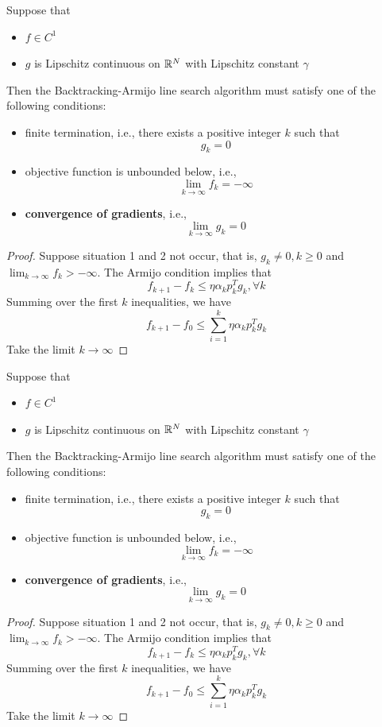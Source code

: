 \begin{refsection}
\begin{corollary}\cite{Robinson2015nonlinear}
	Suppose that
	\begin{itemize}
		\item $f\in C^1$
		\item $g$ is Lipschitz continuous on $\mathbb{R}^N$ with Lipschitz constant $\gamma$
	\end{itemize}
	Then the Backtracking-Armijo line search algorithm must satisfy one of the following conditions:
	\begin{itemize}
		\item finite termination, i.e., there exists a positive integer $k$ such that
		$$g_k = 0$$
		\item objective function is unbounded below, i.e., 
		$$\lim_{k\to \infty} f_k = -\infty$$
		\item \textbf{convergence of gradients}, i.e., 
		$$\lim_{k\to\infty} g_k = 0$$
	\end{itemize}
\end{corollary}
\begin{proof}
	Suppose situation 1 and 2 not occur, that is, $g_k \neq 0, k\geq 0$ and $\lim_{k\to \infty} f_k > -\infty$. 
	The Armijo condition implies that 
	$$f_{k+1}-f_k \leq \eta \alpha_k p_k^T g_k, \forall k$$
	Summing over the first $k$ inequalities, we have
	$$f_{k+1} - f_0 \leq \sum_{i=1}^k \eta \alpha_k p_k^T g_k$$
	Take the limit $k\to \infty$
\end{proof}


\begin{corollary}\cite{Robinson2015nonlinear}
	Suppose that
	\begin{itemize}
		\item $f\in C^1$
		\item $g$ is Lipschitz continuous on $\mathbb{R}^N$ with Lipschitz constant $\gamma$
	\end{itemize}
	Then the Backtracking-Armijo line search algorithm must satisfy one of the following conditions:
	\begin{itemize}
		\item finite termination, i.e., there exists a positive integer $k$ such that
		$$g_k = 0$$
		\item objective function is unbounded below, i.e., 
		$$\lim_{k\to \infty} f_k = -\infty$$
		\item \textbf{convergence of gradients}, i.e., 
		$$\lim_{k\to\infty} g_k = 0$$
	\end{itemize}
\end{corollary}
\begin{proof}
	Suppose situation 1 and 2 not occur, that is, $g_k \neq 0, k\geq 0$ and $\lim_{k\to \infty} f_k > -\infty$. 
	The Armijo condition implies that 
	$$f_{k+1}-f_k \leq \eta \alpha_k p_k^T g_k, \forall k$$
	Summing over the first $k$ inequalities, we have
	$$f_{k+1} - f_0 \leq \sum_{i=1}^k \eta \alpha_k p_k^T g_k$$
	Take the limit $k\to \infty$
\end{proof}




\end{refsection}
